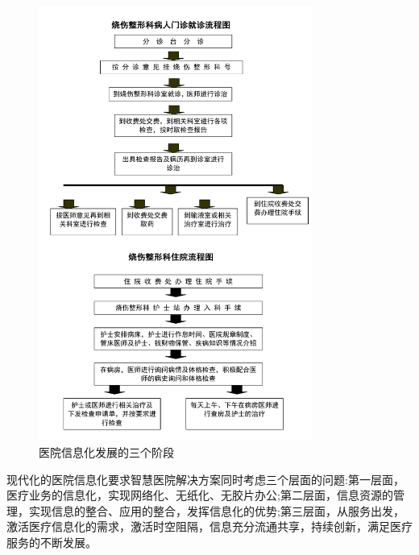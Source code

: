 \documentclass[doctor,secret]{thuthesis}
\begin{document}
\begin{figure}[htbp]
\centering
\includegraphics[width=0.8\textwidth]{figures/medicalinformationstags.pdf}
\caption{医院信息化发展的三个阶段 \label{fig:medicalinformationstages}}
\end{figure} 

现代化的医院信息化要求智慧医院解决方案同时考虑三个层面的问题:第一层面，医疗业务的信息化，实现网络化、无纸化、无胶片办公;第二层面，信息资源的管理，实现信息的整合、应用的整合，发挥信息化的优势;第三层面，从服务出发，激活医疗信息化的需求，激活时空阻隔，信息充分流通共享，持续创新，满足医疗服务的不断发展。
\end{document}
